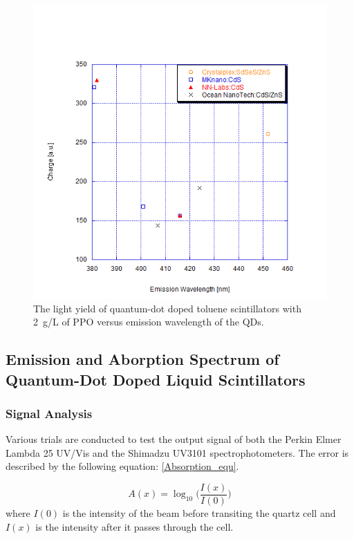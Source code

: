 \documentclass{JINST}
\begin{document}
\begin{figure}[tbh]
        \begin{center}
        \includegraphics[scale=0.3] {graphs/Light_Yield/QDots_Light_Yield.png}
\caption[]{The light yield of quantum-dot doped toluene scintillators with 2~g/L of PPO versus emission wavelength of the QDs.\label{ly_QD}}
\end{center}
\end{figure}

\subsection{Emission and Aborption Spectrum of Quantum-Dot Doped Liquid Scintillators}

\subsubsection{Signal Analysis}
Various trials are conducted to test the output signal of both the Perkin Elmer Lambda 25 UV/Vis and the Shimadzu UV3101 spectrophotometers\cite{lindley13}. The error is described by the following equation:
 \ref{Absorption_equ}.

\begin{equation}
\label{Absorption_equ}
A(x)=\log_{10}\Big(\frac{I(x)}{I(0)}\Big)
\end{equation}
where  $I(0)$ is the intensity of the beam before transiting the quartz cell and $I(x)$ is the intensity after it passes through the cell. 
\end{document}
